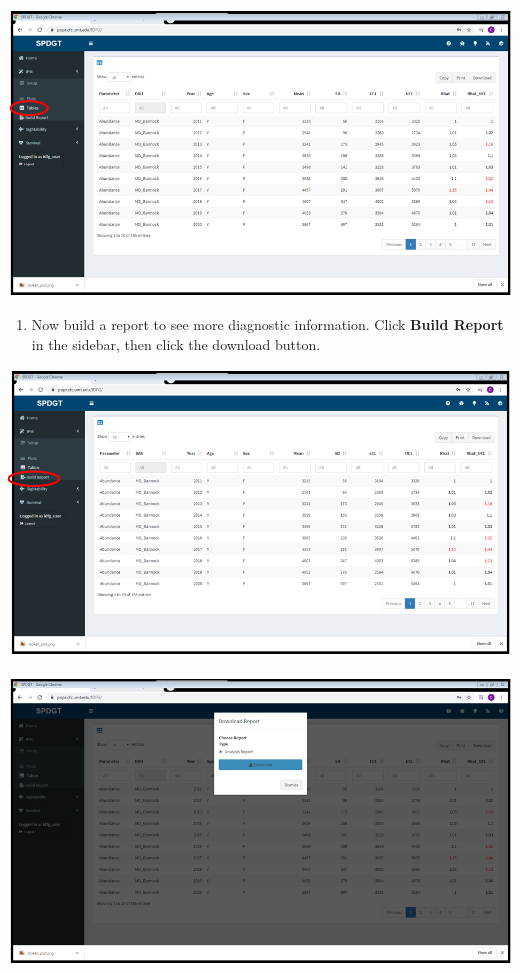 \documentclass[
]{book}
\providecommand{\tightlist}{%
  \setlength{\itemsep}{0pt}\setlength{\parskip}{0pt}}
\begin{document}
\includegraphics{./www/ipm_11.PNG}

\begin{enumerate}
\def\labelenumi{\arabic{enumi}.}
\setcounter{enumi}{11}
\tightlist
\item
  Now build a report to see more diagnostic information. Click \textbf{Build Report} in the sidebar, then click the download button.
\end{enumerate}

\includegraphics{./www/ipm_12.PNG}

\includegraphics{./www/ipm_13.PNG}
\end{document}
